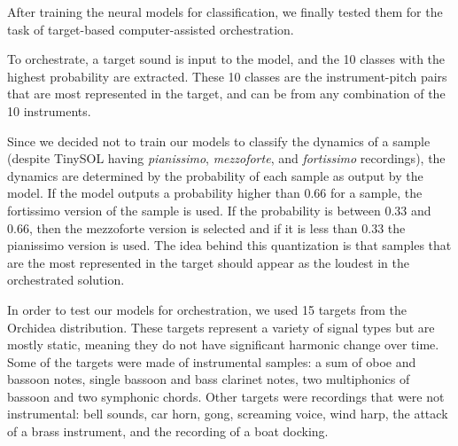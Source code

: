 \documentclass[runningheads,a4paper]{llncs}
\begin{document}
After training the neural models for classification, we finally tested them for the task of target-based computer-assisted orchestration. 

To orchestrate, a target sound is input to the model, and the 10 classes with the highest probability are extracted. These 10 classes are the instrument-pitch pairs that are most represented in the target, and can be from any combination of the 10 instruments. 

Since we decided not to train our models to classify the dynamics of a sample (despite TinySOL having \emph{pianissimo}, \emph{mezzoforte}, and \emph{fortissimo} recordings), the dynamics are determined by the probability of each sample as output by the model. If the model outputs a probability higher than $0.66$ for a sample, the fortissimo version of the sample is used. If the probability is between $0.33$ and $0.66$, then the mezzoforte version is selected and if it is less than $0.33$ the pianissimo version is used. The idea behind this quantization is that samples that are the most represented in the target should appear as the loudest in the orchestrated solution.

In order to test our models for orchestration, we used 15 targets from the Orchidea distribution. These targets represent a variety of signal types but are mostly static, meaning they do not have significant harmonic change over time. Some of the targets were made of instrumental samples: a sum of oboe and bassoon notes, single bassoon and bass clarinet notes, two multiphonics of bassoon and two symphonic chords. Other targets were recordings that were not instrumental: bell sounds, car horn, gong, screaming voice, wind harp, the attack of a brass instrument, and the recording of a boat docking.
\end{document}
